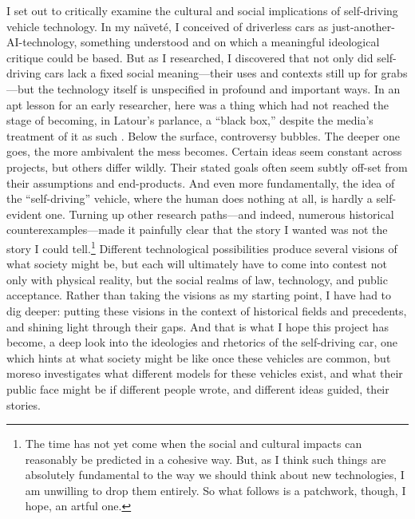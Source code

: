 I set out to critically examine the cultural and social
implications of self-driving vehicle technology. In my na\"{\i}vet\'{e}, I
conceived of driverless cars as just-another-AI-technology, something
understood and on which a meaningful ideological critique could be
based. But as I researched, I discovered that not only did
self-driving cars lack a fixed social meaning---their uses and
contexts still up for grabs---but the technology itself is unspecified
in profound and important ways. In an apt lesson for an early researcher,
here was a thing which had not reached the stage of becoming, in
Latour's parlance, a ``black box,'' despite the media's treatment of
it as such \cite{LatourScience}. Below the surface, controversy
bubbles. The deeper one 
goes, the more ambivalent the mess becomes. Certain ideas seem
constant across projects, but others differ wildly. Their stated goals
often seem subtly off-set from their assumptions and end-products. And
even more fundamentally, the idea of the ``self-driving'' vehicle,
where the human does nothing at all, is hardly a self-evident one.
Turning up other research paths---and indeed, numerous historical
counterexamples---made it painfully clear that the story I wanted was
not the story I could tell.\footnote{The time has not yet come when the social
and cultural impacts can reasonably be predicted in a cohesive way.
But, as I think such things are absolutely fundamental to the way we
should think about new technologies, I am unwilling to drop them
entirely. So what follows is a patchwork, though, I hope, an artful
one.} Different technological possibilities produce several visions of
what society might be, but each will ultimately have to come into
contest not only with physical reality, but the social realms of law,
technology, and public acceptance. Rather than taking the visions as
my starting point, I have had to dig deeper: putting these visions in the context of
historical fields and precedents, and shining light through their
gaps. And that is what I hope this project has become, a 
deep look into the ideologies and rhetorics of the self-driving car,
one which hints at what society might be like once these
vehicles are common, but moreso investigates what different models for these vehicles
exist, and what their public face might be if different people wrote,
and different ideas guided, their stories.

